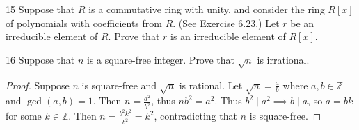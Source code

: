 \begin{problem}{15}
    Suppose that $R$ is a commutative ring with unity, and consider the ring $R[x]$ of
    polynomials with coefficients from $R$. (See Exercise 6.23.) Let $r$ be an
    irreducible element of $R$. Prove that $r$ is an irreducible element of $R[x]$.
\end{problem}
\unsolved

\begin{problem}{16}
    Suppose that $n$ is a square-free integer.
    Prove that $\sqrt{n}$ is irrational.
\end{problem}
\solved

\begin{proof}
    Suppose $n$ is square-free and $\sqrt{n}$ is rational.
    Let $\sqrt{n} = \frac{a}{b}$ where $a,b \in \mathbb{Z}$ and $\gcd(a, b) = 1$.
    Then $n = \frac{a^2}{b^2}$, thus $n b^2 = a^2$.
    Thus $b^2 \mid a^2 \implies b \mid a$, so $a = b k$ for some $k \in \mathbb{Z}$.
    Then $n = \frac{b^2 k^2}{b^2} = k^2$, contradicting that $n$ is square-free.
\end{proof}
